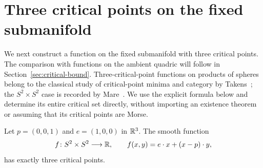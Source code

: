 \section{Three critical points on the fixed submanifold}
\label{sec:three-points}

We next construct a function on the fixed submanifold with three
critical points. The comparison with functions on the ambient quadric
will follow in Section~\ref{sec:critical-bound}.
Three-critical-point functions on products of spheres belong to the
classical study of critical-point minima and category by
Takens~\cite{Takens1968}; the $S^2\times S^2$ case is recorded by
Mare~\cite[Proposition~3.2.5]{Mare1997}. We use the explicit formula below
and determine its entire critical set directly, without importing an
existence theorem or assuming that its critical points are Morse.

\begin{proposition}
\label{prop:three-points}
Let $p=(0,0,1)$ and $e=(1,0,0)$ in $\mathbb R^3$.
The smooth function
\begin{equation}
\label{eq:three-point-function}
  f\colon S^2\times S^2\longrightarrow\mathbb R,
  \qquad f(x,y)=e\cdot x+(x-p)\cdot y,
\end{equation}
has exactly three critical points.
\end{proposition}

